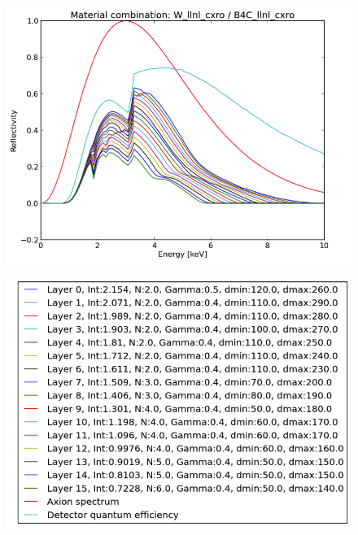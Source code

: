 \begin{figure}[htbp]
\centering
\begin{minipage}{.5\textwidth}
  \centering
  \includegraphics[width=\linewidth]{figures/cast/w-b4c-result-1.png}
  \label{fig:w-b4c-result-1}
\end{minipage}%
\begin{minipage}{.5\textwidth}
  \centering  \includegraphics[width=\linewidth]{figures/cast/w-b4c-result-2.png}
  \label{fig:w-b4c-result-2}
\end{minipage}
\end{figure}



